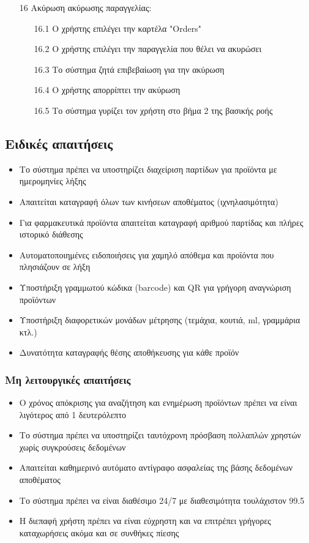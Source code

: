 \documentclass[12pt,a4paper,twoside]{book}
\begin{document}
\begin{enumerate}
  \item[16 ] Ακύρωση ακύρωσης παραγγελίας:
        \begin{enumerate}
          \item [16.1 ] Ο χρήστης επιλέγει την καρτέλα "Orders"
          \item [16.2 ] Ο χρήστης επιλέγει την παραγγελία που θέλει να ακυρώσει
          \item [16.3 ] Το σύστημα ζητά επιβεβαίωση για την ακύρωση
          \item [16.4 ] Ο χρήστης απορρίπτει την ακύρωση
          \item [16.5 ] Το σύστημα γυρίζει τον χρήστη στο βήμα 2 της βασικής ροής
        \end{enumerate}
\end{enumerate}

\subsection{Ειδικές απαιτήσεις}
\begin{itemize}
  \item Το σύστημα πρέπει να υποστηρίζει διαχείριση παρτίδων για προϊόντα με ημερομηνίες λήξης
  \item Απαιτείται καταγραφή όλων των κινήσεων αποθέματος (ιχνηλασιμότητα)
  \item Για φαρμακευτικά προϊόντα απαιτείται καταγραφή αριθμού παρτίδας και πλήρες ιστορικό διάθεσης
  \item Αυτοματοποιημένες ειδοποιήσεις για χαμηλό απόθεμα και προϊόντα που πλησιάζουν σε λήξη
  \item Υποστήριξη γραμμωτού κώδικα (barcode) και QR για γρήγορη αναγνώριση προϊόντων
  \item Υποστήριξη διαφορετικών μονάδων μέτρησης (τεμάχια, κουτιά, ml, γραμμάρια κτλ.)
  \item Δυνατότητα καταγραφής θέσης αποθήκευσης για κάθε προϊόν
\end{itemize}

\subsubsection{Μη λειτουργικές απαιτήσεις}
\begin{itemize}
  \item Ο χρόνος απόκρισης για αναζήτηση και ενημέρωση προϊόντων πρέπει να είναι λιγότερος από 1 δευτερόλεπτο
  \item Το σύστημα πρέπει να υποστηρίζει ταυτόχρονη πρόσβαση πολλαπλών χρηστών χωρίς συγκρούσεις δεδομένων
  \item Απαιτείται καθημερινό αυτόματο αντίγραφο ασφαλείας της βάσης δεδομένων αποθέματος
  \item Το σύστημα πρέπει να είναι διαθέσιμο 24/7 με διαθεσιμότητα τουλάχιστον 99.5%
  \item Η διεπαφή χρήστη πρέπει να είναι εύχρηστη και να επιτρέπει γρήγορες καταχωρήσεις ακόμα και σε συνθήκες πίεσης
\end{itemize}
\end{document}
